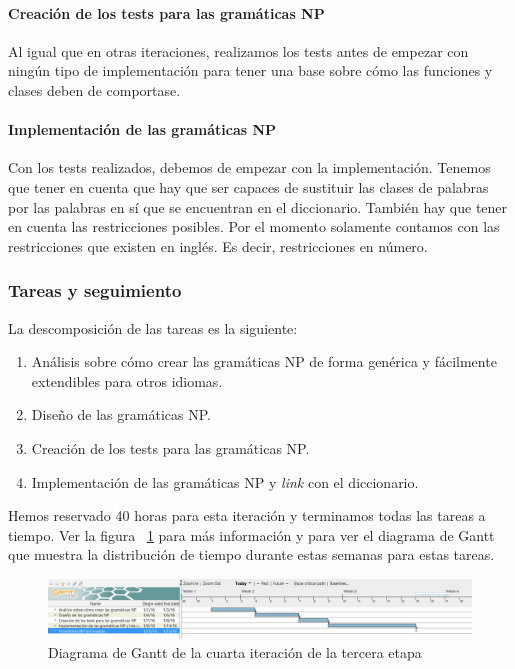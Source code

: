 \paragraph{Creación de los tests para las gramáticas NP} Al igual que en otras iteraciones, realizamos los tests antes de empezar con ningún tipo de implementación para tener una base sobre cómo las funciones y clases deben de comportase.

\paragraph{Implementación de las gramáticas NP} Con los tests realizados, debemos de empezar con la implementación. Tenemos que tener en cuenta que hay que ser capaces de sustituir las clases de palabras por las palabras en sí que se encuentran en el diccionario. También hay que tener en cuenta las restricciones posibles. Por el momento solamente contamos con las restricciones que existen en inglés. Es decir, restricciones en número.

\subsubsection{Tareas y seguimiento}

La descomposición de las tareas es la siguiente:

\begin{enumerate}[label=\bfseries WBS 4.\arabic*]
  \item Análisis sobre cómo crear las gramáticas NP de forma genérica y fácilmente extendibles para otros idiomas.
  \item Diseño de las gramáticas NP.
  \item Creación de los tests para las gramáticas NP.
  \item Implementación de las gramáticas NP y \textit{link} con el diccionario.
\end{enumerate}

Hemos reservado 40 horas para esta iteración y terminamos todas las tareas a tiempo. Ver la figura ~\ref{fig:sec3it4} para más información y para ver el diagrama de Gantt que muestra la distribución de tiempo durante estas semanas para estas tareas.

\begin{figure}
    \includegraphics[width=\textwidth,height=\textheight,keepaspectratio]{./img/sec3it4.png}
  \caption{Diagrama de Gantt de la cuarta iteración de la tercera etapa}
  \label{fig:sec3it4}
\end{figure}

